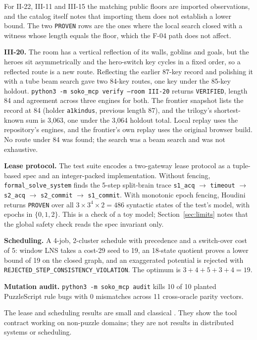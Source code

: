 \documentclass[11pt,a4paper]{article}
\begin{document}
For II-22, III-11 and III-15 the matching public floors are imported observations, and the catalog itself notes that importing them does not establish a lower bound. The two \texttt{PROVEN} rows are the ones where the local search closed with a witness whose length equals the floor, which the F-04 path does not affect.

\textbf{III-20.} The room has a vertical reflection of its walls, goblins and goals, but the heroes sit asymmetrically and the hero-switch key cycles in a fixed order, so a reflected route is a new route. Reflecting the earlier 87-key record and polishing it with a tube beam search gave two 84-key routes, one key under the 85-key holdout. \texttt{python3 -m soko\_mcp verify --room III-20} returns \texttt{VERIFIED}, length 84 and agreement across three engines for both. The frontier snapshot lists the record at 84 (holder \texttt{a1kindus}, previous length 87), and the trilogy's shortest-known sum is 3,063, one under the 3,064 holdout total. Local replay uses the repository's engines, and the frontier's own replay uses the original browser build. No route under 84 was found; the search was a beam search and was not exhaustive.

\textbf{Lease protocol.} The test suite encodes a two-gateway lease protocol as a tuple-based spec and an integer-packed implementation. Without fencing, \texttt{formal\_solve\_system} finds the 5-step split-brain trace \texttt{s1\_acq} $\to$ \texttt{timeout} $\to$ \texttt{s2\_acq} $\to$ \texttt{s2\_commit} $\to$ \texttt{s1\_commit}. With monotonic epoch fencing, Houdini returns \texttt{PROVEN} over all $3\times 3^{4}\times 2 = 486$ syntactic states of the test's model, with epochs in $\{0,1,2\}$. This is a check of a toy model; Section~\ref{sec:limits} notes that the global safety check reads the spec invariant only.

\textbf{Scheduling.} A 4-job, 2-cluster schedule with precedence and a switch-over cost of 5: window LNS takes a cost-29 seed to 19, an 18-state quotient proves a lower bound of 19 on the closed graph, and an exaggerated potential is rejected with \texttt{REJECTED\_\allowbreak STEP\_\allowbreak CONSISTENCY\_\allowbreak VIOLATION}. The optimum is $3+4+5+3+4 = 19$.

\textbf{Mutation audit.} \texttt{python3 -m soko\_mcp audit} kills 10 of 10 planted PuzzleScript rule bugs with 0 mismatches across 11 cross-oracle parity vectors.

The lease and scheduling results are small and classical \cite{lamport1978time,kleppmann2016fencing}. They show the tool contract working on non-puzzle domains; they are not results in distributed systems or scheduling.
\end{document}
